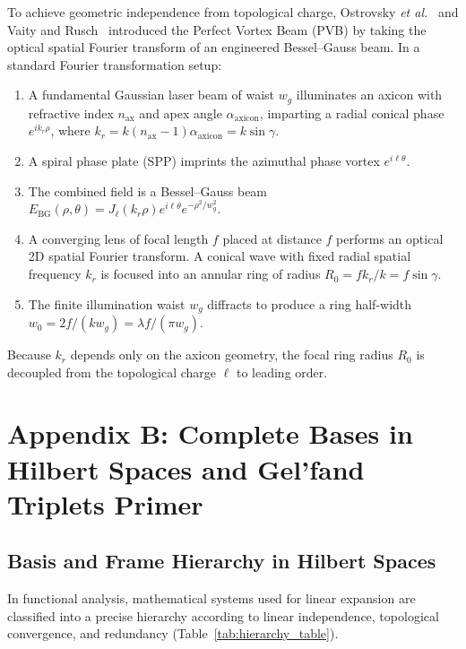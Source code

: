 \documentclass[11pt,a4paper]{article}
\begin{document}
To achieve geometric independence from topological charge, Ostrovsky \emph{et al.}~\cite{Ostrovsky2013} and Vaity and Rusch~\cite{Vaity2015} introduced the Perfect Vortex Beam (PVB) by taking the optical spatial Fourier transform of an engineered Bessel--Gauss beam. In a standard Fourier transformation setup:
\begin{enumerate}
    \item A fundamental Gaussian laser beam of waist $w_g$ illuminates an axicon with refractive index $n_{\text{ax}}$ and apex angle $\alpha_{\text{axicon}}$, imparting a radial conical phase $e^{i k_r \rho}$, where $k_r = k (n_{\text{ax}}-1) \alpha_{\text{axicon}} = k \sin \gamma$.
    \item A spiral phase plate (SPP) imprints the azimuthal phase vortex $e^{i \ell \theta}$.
    \item The combined field is a Bessel--Gauss beam $E_{\text{BG}}(\rho, \theta) = J_\ell(k_r \rho) e^{i \ell \theta} e^{-\rho^2 / w_g^2}$.
    \item A converging lens of focal length $f$ placed at distance $f$ performs an optical 2D spatial Fourier transform. A conical wave with fixed radial spatial frequency $k_r$ is focused into an annular ring of radius $R_0 = f k_r / k = f \sin \gamma$.
    \item The finite illumination waist $w_g$ diffracts to produce a ring half-width $w_0 = 2f / (k w_g) = \lambda f / (\pi w_g)$.
\end{enumerate}
Because $k_r$ depends only on the axicon geometry, the focal ring radius $R_0$ is decoupled from the topological charge $\ell$ to leading order.

\section{Appendix B: Complete Bases in Hilbert Spaces and Gel'fand Triplets Primer}
\label{app:hilbert}

\subsection{Basis and Frame Hierarchy in Hilbert Spaces}

In functional analysis, mathematical systems used for linear expansion are classified into a precise hierarchy according to linear independence, topological convergence, and redundancy (Table~\ref{tab:hierarchy_table}).
\end{document}
